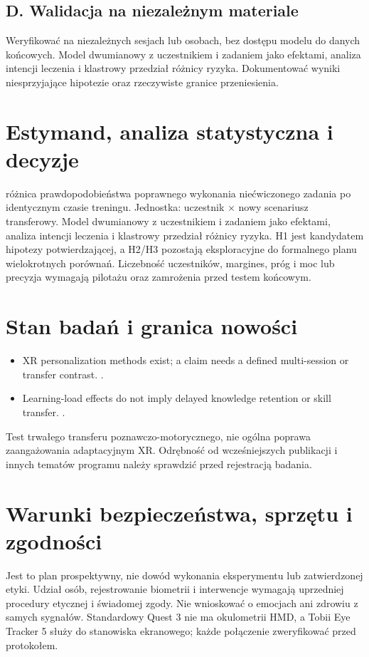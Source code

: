 \documentclass[11pt,a4paper]{article}
\begin{document}
\subsection{D. Walidacja na niezależnym materiale}
Weryfikować na niezależnych sesjach lub osobach, bez dostępu modelu do danych końcowych. Model dwumianowy z uczestnikiem i zadaniem jako efektami, analiza intencji leczenia i klastrowy przedział różnicy ryzyka. Dokumentować wyniki niesprzyjające hipotezie oraz rzeczywiste granice przeniesienia.
\section{Estymand, analiza statystyczna i decyzje}
różnica prawdopodobieństwa poprawnego wykonania niećwiczonego zadania po identycznym czasie treningu. Jednostka: uczestnik × nowy scenariusz transferowy. Model dwumianowy z uczestnikiem i zadaniem jako efektami, analiza intencji leczenia i klastrowy przedział różnicy ryzyka. H1 jest kandydatem hipotezy potwierdzającej, a H2/H3 pozostają eksploracyjne do formalnego planu wielokrotnych porównań. Liczebność uczestników, margines, próg i moc lub precyzja wymagają pilotażu oraz zamrożenia przed testem końcowym.
\section{Stan badań i granica nowości}
\begin{itemize}
\item XR personalization methods exist; a claim needs a defined multi-session or transfer contrast. \cite{xrprior1}.
\item Learning-load effects do not imply delayed knowledge retention or skill transfer. \cite{xrprior2}.
\end{itemize}
Test trwałego transferu poznawczo-motorycznego, nie ogólna poprawa zaangażowania adaptacyjnym XR. Odrębność od wcześniejszych publikacji i innych tematów programu należy sprawdzić przed rejestracją badania.
\section{Warunki bezpieczeństwa, sprzętu i zgodności}
Jest to plan prospektywny, nie dowód wykonania eksperymentu lub zatwierdzonej etyki. Udział osób, rejestrowanie biometrii i interwencje wymagają uprzedniej procedury etycznej i świadomej zgody. Nie wnioskować o emocjach ani zdrowiu z samych sygnałów. Standardowy Quest 3 nie ma okulometrii HMD, a Tobii Eye Tracker 5 służy do stanowiska ekranowego; każde połączenie zweryfikować przed protokołem.
\end{document}
